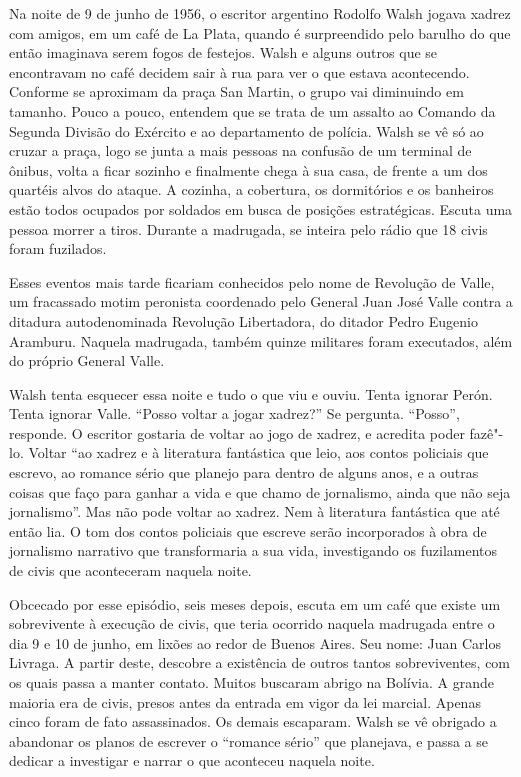 \asterisc

Na noite de 9 de junho de 1956, o escritor argentino Rodolfo Walsh
jogava xadrez com amigos, em um café de La Plata, quando é surpreendido
pelo barulho do que então imaginava serem fogos de festejos. Walsh e
alguns outros que se encontravam no café decidem sair à rua para ver o
que estava acontecendo. Conforme se aproximam da praça San Martin, o
grupo vai diminuindo em tamanho. Pouco a pouco, entendem que se trata de
um assalto ao Comando da Segunda Divisão do Exército e ao departamento
de polícia. Walsh se vê só ao cruzar a praça, logo se junta a mais
pessoas na confusão de um terminal de ônibus, volta a ficar sozinho e
finalmente chega à sua casa, de frente a um dos quartéis alvos do
ataque. A cozinha, a cobertura, os dormitórios e os banheiros estão
todos ocupados por soldados em busca de posições estratégicas. Escuta
uma pessoa morrer a tiros. Durante a madrugada, se inteira pelo rádio que
18 civis foram fuzilados.

Esses eventos mais tarde ficariam conhecidos pelo nome de Revolução de
Valle, um fracassado motim peronista coordenado pelo General Juan José
Valle contra a ditadura autodenominada Revolução Libertadora, do ditador
Pedro Eugenio Aramburu. Naquela madrugada, também quinze militares foram
executados, além do próprio General Valle.

Walsh tenta esquecer essa noite e tudo o que viu e ouviu. Tenta ignorar
Perón. Tenta ignorar Valle. ``Posso voltar a jogar xadrez?'' Se
pergunta. ``Posso'', responde. O escritor gostaria de voltar ao jogo de
xadrez, e acredita poder fazê"-lo. Voltar ``ao xadrez e à literatura
fantástica que leio, aos contos policiais que escrevo, ao romance sério
que planejo para dentro de alguns anos, e a outras coisas que faço para
ganhar a vida e que chamo de jornalismo, ainda que não seja
jornalismo''. Mas não pode voltar ao xadrez. Nem à literatura fantástica
que até então lia. O tom dos contos policiais que escreve serão incorporados à obra de jornalismo narrativo que transformaria a sua vida, investigando os fuzilamentos de civis que aconteceram naquela noite.

Obcecado por esse episódio, seis meses depois, escuta em
um café que existe um sobrevivente à execução de civis, que teria
ocorrido naquela madrugada entre o dia 9 e 10 de junho, em lixões ao
redor de Buenos Aires. Seu nome: Juan Carlos Livraga. A partir deste,
descobre a existência de outros tantos sobreviventes, com os quais passa
a manter contato. Muitos buscaram abrigo na Bolívia. A grande
maioria era de civis, presos antes da entrada em vigor da lei marcial.
Apenas cinco foram de fato assassinados. Os demais escaparam.
Walsh se vê obrigado a abandonar os planos de escrever o ``romance
sério'' que planejava, e passa a se dedicar a investigar e narrar o que
aconteceu naquela noite.

